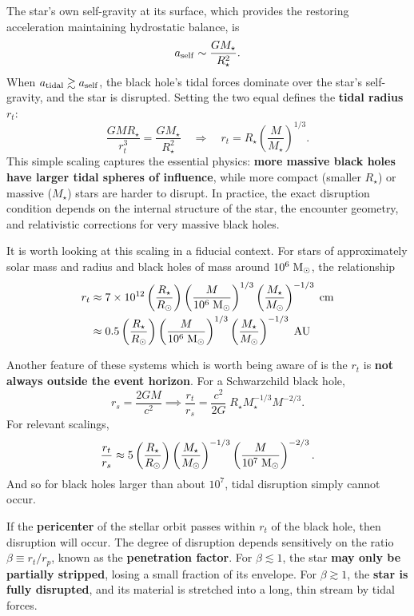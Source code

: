 The star’s own self-gravity at its surface, which provides the restoring acceleration maintaining hydrostatic balance, is
\[
a_{\rm self} \sim \frac{G M_\star}{R_\star^2}.
\]
When $a_{\rm tidal} \gtrsim a_{\rm self}$, the black hole’s tidal forces dominate over the star’s self-gravity, and the star is disrupted. Setting the two equal defines the \textbf{tidal radius} $r_t$:
\[
\frac{G M R_\star}{r_t^3} = \frac{G M_\star}{R_\star^2}
\quad \Longrightarrow \quad
\boxed{r_t = R_\star \left(\frac{M}{M_\star}\right)^{1/3}}.
\]
This simple scaling captures the essential physics: \textbf{more massive black holes have larger tidal spheres of influence}, while more compact (smaller $R_\star$) or massive ($M_\star$) stars are harder to disrupt. In practice, the exact disruption condition depends on the internal structure of the star, the encounter geometry, and relativistic corrections for very massive black holes.
\par
It is worth looking at this scaling in a fiducial context. For stars of approximately solar mass and radius and black holes of mass around $10^6\;{\rm M_\odot}$, the relationship
\[
\begin{aligned}
    r_t &\approx 7 \times 10^{12} \left(\frac{R_\star}{R_\odot}\right) \left(\frac{M}{10^6\;{\rm M_\odot}}\right)^{1/3} \left(\frac{M_\star}{M_\odot}\right)^{-1/3} \; {\rm cm}\\
    &\approx 0.5 \left(\frac{R_\star}{R_\odot}\right) \left(\frac{M}{10^6\;{\rm M_\odot}}\right)^{1/3} \left(\frac{M_\star}{M_\odot}\right)^{-1/3} \; {\rm AU}
\end{aligned}
\]
\par
Another feature of these systems which is worth being aware of is the $r_t$ is \textbf{not always outside the event horizon}. For a Schwarzchild black hole, 
\[
r_s = \frac{2GM}{c^2} \implies \frac{r_t}{r_s} =\frac{c^2}{2G}\; R_\star M_\star^{-1/3} M^{-2/3}.
\]
For relevant scalings,
\[
\frac{r_t}{r_s} \approx 5 \left(\frac{R_\star}{R_\odot}\right) \left(\frac{M_\star}{M_\odot}\right)^{-1/3}\left(\frac{M}{10^7\;{\rm M_\odot}}\right)^{-2/3}.
\]
And so for black holes larger than about $10^7$, tidal disruption simply cannot occur.
\par
If the \textbf{pericenter} of the stellar orbit passes within $r_t$ of the black hole, then disruption will occur. The degree of disruption depends sensitively on the ratio $\beta \equiv r_t / r_p$, known as the \textbf{penetration factor}. For $\beta \lesssim 1$, the star \textbf{may only be partially stripped}, losing a small fraction of its envelope. For $\beta \gtrsim 1$, the \textbf{star is fully disrupted}, and its material is stretched into a long, thin stream by tidal forces.

